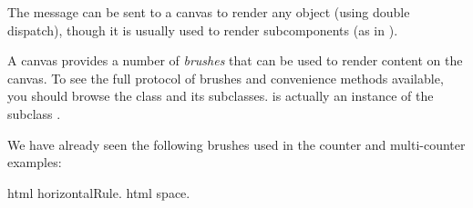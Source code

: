 \documentclass[a4paper,10pt,twoside]{book}
\begin{document}
The message  can be sent to a canvas to render any object (using double dispatch), though it is usually used to render subcomponents (as in ).

A canvas provides a number of \emph{brushes} that can be used to render content on the canvas.
To see the full protocol of brushes and convenience methods available, you should browse the class  and its subclasses.
 is actually an instance of the subclass .

We have already seen the following brushes used in the counter and multi-counter examples:
\begin{code}{}
html horizontalRule.
html space.
\end{code}



\end{document}
